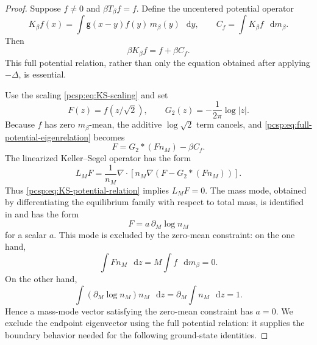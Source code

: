 \documentclass[11pt,reqno]{amsart}
\numberwithin{equation}{section}
\theoremstyle{plain}
\theoremstyle{definition}
\newcommand{\dd}{\mathop{}\!\mathrm d}
\newcommand{\be}{\beta}
\newcommand{\g}{\mathsf g}
\begin{document}
\begin{proof}
Suppose $f\neq0$ and $\be T_\be f=f$.  Define the uncentered potential operator
\begin{equation}\label{pcsp:eq:uncentered-operator}
 K_\be f(x)=\int\g(x-y)f(y)\,m_\be(y)\,\dd y,
 \qquad
 C_f=\int K_\be f\,\dd m_\be.
\end{equation}
Then
\begin{equation}\label{pcsp:eq:full-potential-eigenrelation}
 \be K_\be f=f+\be C_f.
\end{equation}
This full potential relation, rather than only the equation obtained after applying $-\Delta$, is essential.

Use the scaling \eqref{pcsp:eq:KS-scaling} and set
\begin{equation}\label{pcsp:eq:F-scaled}
 F(z)=f(z/\sqrt2),
 \qquad
 G_2(z)=-\frac1{2\pi}\log|z|.
\end{equation}
Because $f$ has zero $m_\be$-mean, the additive $\log\sqrt2$ term cancels, and \eqref{pcsp:eq:full-potential-eigenrelation} becomes
\begin{equation}\label{pcsp:eq:KS-potential-relation}
 F=G_2*(Fn_M)-\be C_f.
\end{equation}
The linearized Keller--Segel operator has the form
\begin{equation}\label{pcsp:eq:KS-linearized-operator}
 L_MF=\frac1{n_M}\nabla\cdot\left[n_M\nabla
 \left(F-G_2*(Fn_M)\right)\right].
\end{equation}
Thus \eqref{pcsp:eq:KS-potential-relation} implies $L_MF=0$.  The mass mode, obtained by differentiating the equilibrium family with respect to total mass, is identified in \cite[Proposition~9]{CamposDolbeault2014} and has the form
\begin{equation}\label{pcsp:eq:KS-kernel}
 F=a\,\partial_M\log n_M
\end{equation}
for a scalar $a$.  This mode is excluded by the zero-mean constraint: on the one hand,
\begin{equation}\label{pcsp:eq:F-zero-mass}
 \int F n_M\,\dd z=M\int f\,\dd m_\be=0.
\end{equation}
On the other hand,
\begin{equation}\label{pcsp:eq:mass-mode-nonzero}
 \int(\partial_M\log n_M)n_M\,\dd z
 =\partial_M\int n_M\,\dd z=1.
\end{equation}
Hence a mass-mode vector satisfying the zero-mean constraint has $a=0$.
We exclude the endpoint eigenvector using the full potential relation: it supplies the boundary behavior needed for the following ground-state identities.


\end{proof}
\end{document}
